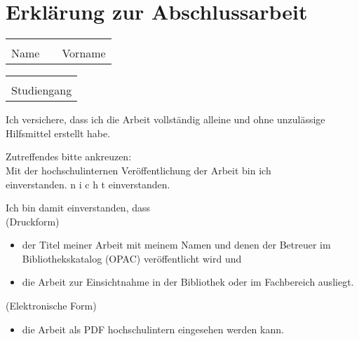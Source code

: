 \chapter*{Erkl\"arung zur Abschlussarbeit}
\label{cha:Erkl\"arung}

\begin{tabular}{lp{1cm}l}
    \hspace{6cm} && \hspace{6cm} \\ \cline{1-1} \cline{3-3}
    Name && Vorname
\end{tabular}

\bigskip

\begin{tabular}{l}
    \hspace{6cm} \\ \cline{1-1}
    Studiengang
\end{tabular}

\bigskip
\bigskip

Ich versichere, dass ich die Arbeit vollst\"andig alleine und ohne unzul\"assige Hilfsmittel erstellt habe.

\bigskip
\bigskip

Zutreffendes bitte ankreuzen:\\
Mit der hochschulinternen Ver\"offentlichung der Arbeit bin ich\\
\Square \hspace{0.2cm} einverstanden. \hspace{1cm} \Square \hspace{0.2cm} n i c h t einverstanden.

\bigskip
\bigskip

Ich bin damit einverstanden, dass\\
(Druckform)
\begin{itemize}
    \item der Titel meiner Arbeit mit meinem Namen und denen der Betreuer im Bibliothekskatalog (OPAC) ver\"offentlicht wird und
    \item die Arbeit zur Einsichtnahme in der Bibliothek oder im Fachbereich ausliegt.
\end{itemize}
(Elektronische Form)
\begin{itemize}
    \item die Arbeit als PDF hochschulintern eingesehen werden kann.
\end{itemize}

